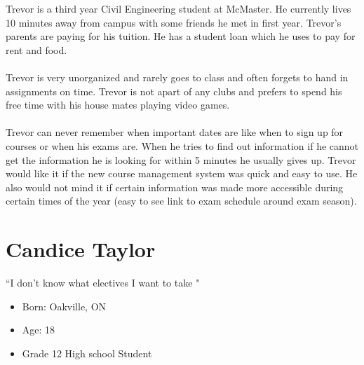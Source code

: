 \documentclass[10pt]{article}
\begin{document}
Trevor is a third year Civil Engineering student at McMaster. He currently lives 10 minutes away from campus with some friends he met in first year. Trevor's parents are paying for his tuition. He has a student loan which he uses to pay for rent and food.\\ \\
Trevor is very unorganized and rarely goes to class and often forgets to hand in assignments on time. Trevor is not apart of any clubs and prefers to spend his free time with his house mates playing video games.\\ \\
Trevor can never remember when important dates are like when to sign up for courses or when his exams are. When he tries to find out information if he cannot get the information he is looking for within 5 minutes he usually gives up. Trevor would like it if the new course management system was quick and easy to use. He also would not mind it if certain information was made more accessible during certain times of the year (easy to see link to exam schedule around exam season).


\newpage


\section{Candice Taylor}
\begin{minipage}{0.5\textwidth}
\begin{center}
``I don't know what electives I want to take "
\end{center}
\end{minipage} \hfill
\begin{minipage}{0.45\textwidth}
\begin{itemize}
\item Born: Oakville, ON
\item Age: 18
\item Grade 12 High school Student
\end{itemize}
\end{minipage}\\ \\ \\
\end{document}
